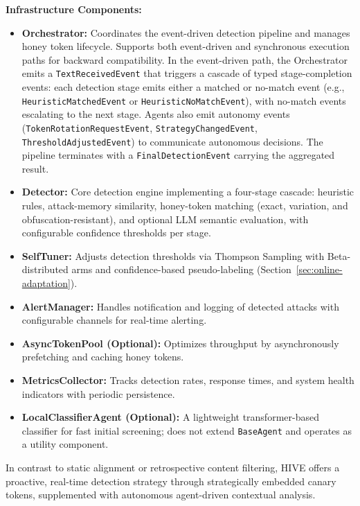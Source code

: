 \documentclass[manuscript,screen,review]{acmart}
\begin{document}
\textbf{Infrastructure Components:}
\begin{itemize}
    \item \textbf{Orchestrator:} Coordinates the event-driven detection pipeline and manages honey token lifecycle. Supports both event-driven and synchronous execution paths for backward compatibility. In the event-driven path, the Orchestrator emits a \texttt{TextReceivedEvent} that triggers a cascade of typed stage-completion events: each detection stage emits either a matched or no-match event (e.g., \texttt{HeuristicMatchedEvent} or \texttt{HeuristicNoMatchEvent}), with no-match events escalating to the next stage. Agents also emit autonomy events (\texttt{TokenRotationRequestEvent}, \texttt{StrategyChangedEvent}, \texttt{ThresholdAdjustedEvent}) to communicate autonomous decisions. The pipeline terminates with a \texttt{FinalDetectionEvent} carrying the aggregated result.

    \item \textbf{Detector:} Core detection engine implementing a four-stage cascade: heuristic rules, attack-memory similarity, honey-token matching (exact, variation, and obfuscation-resistant), and optional LLM semantic evaluation, with configurable confidence thresholds per stage.

    \item \textbf{SelfTuner:} Adjusts detection thresholds via Thompson Sampling with Beta-distributed arms and confidence-based pseudo-labeling (Section~\ref{sec:online-adaptation}).

    \item \textbf{AlertManager:} Handles notification and logging of detected attacks with configurable channels for real-time alerting.

    \item \textbf{AsyncTokenPool (Optional):} Optimizes throughput by asynchronously prefetching and caching honey tokens.

    \item \textbf{MetricsCollector:} Tracks detection rates, response times, and system health indicators with periodic persistence.

    \item \textbf{LocalClassifierAgent (Optional):} A lightweight transformer-based classifier for fast initial screening; does not extend \texttt{BaseAgent} and operates as a utility component.
\end{itemize}

In contrast to static alignment or retrospective content filtering, HIVE offers a proactive, real-time detection strategy through strategically embedded canary tokens, supplemented with autonomous agent-driven contextual analysis.
\end{document}
